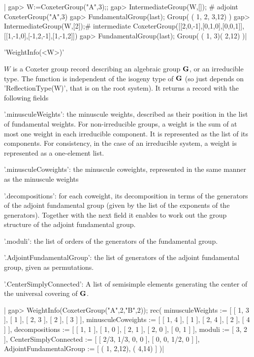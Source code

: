 |    gap> W:=CoxeterGroup("A",3);;
    gap> IntermediateGroup(W,[]); # adjoint
    CoxeterGroup("A",3)
    gap> FundamentalGroup(last);
    Group( ( 1, 2, 3,12) )
    gap> IntermediateGroup(W,[2]);# intermediate
    CoxeterGroup([[2,0,-1],[0,1,0],[0,0,1]],[[1,-1,0],[-1,2,-1],[1,-1,2]])
    gap> FundamentalGroup(last);
    Group( ( 1, 3)( 2,12) )|


'WeightInfo(<W>)'

$W$  is a Coxeter group  record describing an algebraic  group ${\mathbf G}$, or an
irreducible  type. The function is independent of the isogeny type of ${\mathbf G}$
(so  just depends on  'ReflectionType(W)', that is  on the root system). It
returns a record with the following fields\:

'.minusculeWeights': the minuscule weights, described as their position in 
   the list of fundamental weights. For non-irreducible groups, a weight is
   the  sum of  at most  one weight  in each  irreducible component.  It is
   represented  as the list of its components. For consistency, in the case
   of an irreducible system, a weight is represented as a one-element list.

'.minusculeCoweights': the minuscule coweights, represented in the same 
   manner as the minuscule weights

'.decompositions': for each coweight, its decomposition in terms of the
   generators  of the adjoint  fundamental group (given  by the list of the
   exponents of the generators). Together with the next field it enables to
   work out the group structure of the adjoint fundamental group.

'.moduli': the list of orders of the generators of the fundamental group.

'.AdjointFundamentalGroup': the list of generators of the adjoint fundamental
   group, given as permutations.

'.CenterSimplyConnected': A list of semisimple elements generating the center
   of the universal covering of ${\mathbf G}$.

|    gap> WeightInfo(CoxeterGroup("A",2,"B",2));
    rec(
      minusculeWeights := [ [ 1, 3 ], [ 1 ], [ 2, 3 ], [ 2 ], [ 3 ] ],
      minusculeCoweights := [ [ 1, 4 ], [ 1 ], [ 2, 4 ], [ 2 ], [ 4 ] ],
      decompositions := [ [ 1, 1 ], [ 1, 0 ], [ 2, 1 ], [ 2, 0 ], [ 0, 1 ] ],
      moduli := [ 3, 2 ],
      CenterSimplyConnected := [ [ 2/3, 1/3, 0, 0 ], [ 0, 0, 1/2, 0 ] ],
      AdjointFundamentalGroup := [ ( 1, 2,12), ( 4,14) ] )|

